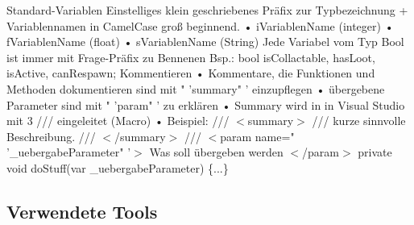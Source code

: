 \documentclass{article}
\begin{document}
Standard-Variablen\newline
Einstelliges klein geschriebenes Präfix zur Typbezeichnung + Variablennamen in CamelCase groß
beginnend.\newline
• iVariablenName (integer)\newline
• fVariablenName (float)\newline
• sVariablenName (String)\newline
\newline
Jede Variabel vom Typ Bool ist immer mit Frage-Präfix zu Bennenen
Bsp.: bool isCollactable, hasLoot, isActive, canRespawn;\newline
Kommentieren\newline
• Kommentare, die Funktionen und Methoden dokumentieren sind mit " 'summary" '
einzupflegen\newline
• übergebene Parameter sind mit " 'param" ' zu erklären\newline
• Summary wird in in Visual Studio mit 3 /// eingeleitet (Macro)\newline
• Beispiel:\newline
/// $<$summary$>$\newline
/// kurze sinnvolle Beschreibung.\newline
/// $<$/summary$>$\newline
/// $<$param name=" '\_uebergabeParameter" '$>$ Was soll übergeben werden $<$/param$>$
private void doStuff(var \_uebergabeParameter) \{...\}\newline


\subsection{Verwendete Tools}
\end{document}
